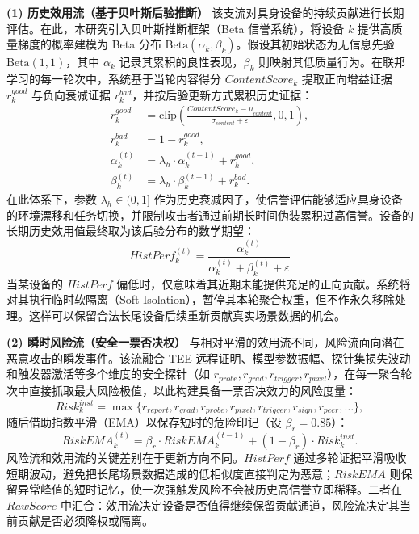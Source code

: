 \documentclass[11pt, a4paper, UTF8, fontset=fandol]{ctexart}
\begin{document}
\textbf{(1) 历史效用流（基于贝叶斯后验推断）}
该支流对具身设备的持续贡献进行长期评估。在此，本研究引入贝叶斯推断框架（Beta 信誉系统），将设备 $k$ 提供高质量梯度的概率建模为 Beta 分布 $\text{Beta}(\alpha_k, \beta_k)$。假设其初始状态为无信息先验 $\text{Beta}(1,1)$，其中 $\alpha_k$ 记录其累积的良性表现，$\beta_k$ 则映射其低质量行为。在联邦学习的每一轮次中，系统基于当轮内容得分 $ContentScore_k$ 提取正向增益证据 $r_{k}^{good}$ 与负向衰减证据 $r_{k}^{bad}$，并按后验更新方式累积历史证据：
\begin{align}
    r_{k}^{good}     & = \mathrm{clip}\left(\frac{ContentScore_{k} - \mu_{content}}{\sigma_{content} + \varepsilon}, 0, 1\right), \\
    r_{k}^{bad}      & = 1 - r_{k}^{good},                                                                                        \\
    \alpha_{k}^{(t)} & = \lambda_h \cdot \alpha_{k}^{(t-1)} + r_{k}^{good},                                                       \\
    \beta_{k}^{(t)}  & = \lambda_h \cdot \beta_{k}^{(t-1)} + r_{k}^{bad}.
\end{align}
在此体系下，参数 $\lambda_h \in (0,1]$ 作为历史衰减因子，使信誉评估能够适应具身设备的环境漂移和任务切换，并限制攻击者通过前期长时间伪装累积过高信誉。设备的长期历史效用值最终取为该后验分布的数学期望：
\begin{equation}
    HistPerf_{k}^{(t)} = \frac{\alpha_{k}^{(t)}}{\alpha_{k}^{(t)} + \beta_{k}^{(t)} + \varepsilon}
\end{equation}
当某设备的 $HistPerf$ 偏低时，仅意味着其近期未能提供充足的正向贡献。系统将对其执行临时软隔离（Soft-Isolation），暂停其本轮聚合权重，但不作永久移除处理。这样可以保留合法长尾设备后续重新贡献真实场景数据的机会。

\textbf{(2) 瞬时风险流（安全一票否决权）}
与相对平滑的效用流不同，风险流面向潜在恶意攻击的瞬发事件。该流融合 TEE 远程证明、模型参数振幅、探针集损失波动和触发器激活等多个维度的安全探针（如 $r_{probe}, r_{grad}, r_{trigger}, r_{pixel}$），在每一聚合轮次中直接抓取最大风险极值，以此构建具备一票否决效力的风险度量：
\begin{equation}
    Risk_{k}^{inst} = \max\{r_{report}, r_{grad}, r_{probe}, r_{pixel}, r_{trigger}, r_{sign}, r_{peer}, \dots \},
\end{equation}
随后借助指数平滑（EMA）以保存短时的危险印记（设 $\beta_r = 0.85$）：
\begin{equation}
    RiskEMA_{k}^{(t)} = \beta_{r} \cdot RiskEMA_{k}^{(t-1)} + (1 - \beta_{r}) \cdot Risk_{k}^{inst}.
\end{equation}
风险流和效用流的关键差别在于更新方向不同。$HistPerf$ 通过多轮证据平滑吸收短期波动，避免把长尾场景数据造成的低相似度直接判定为恶意；$RiskEMA$ 则保留异常峰值的短时记忆，使一次强触发风险不会被历史高信誉立即稀释。二者在 $RawScore$ 中汇合：效用流决定设备是否值得继续保留贡献通道，风险流决定其当前贡献是否必须降权或隔离。
\end{document}

